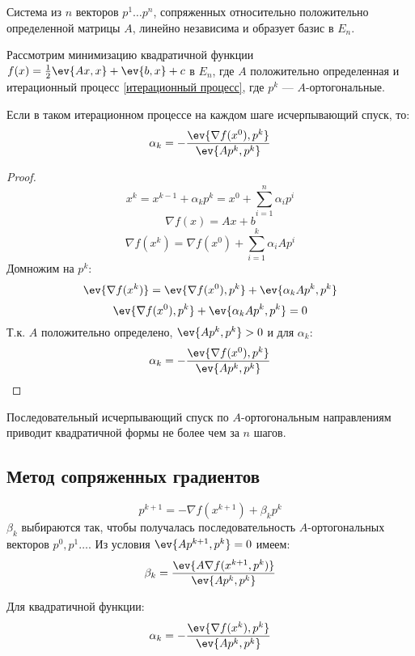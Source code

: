 Система из \(n\) векторов \(p^1 \dots p^n\), сопряженных относительно положительно определенной матрицы \(A\), линейно независима и образует базис в \(E_n\).

Рассмотрим минимизацию квадратичной функции \(f(x) = \frac{1}{2} \ev{Ax, x} + \ev{b, x} + c\) в \(E_n\), где \(A\) положительно определенная и итерационный процесс \eqref{итерационный процесс}, где \(p^k\) --- \(A\)-ортогональные.

Если в таком итерационном процессе на каждом шаге исчерпывающий спуск, то:
\[\alpha_k = -\frac{\ev{\nabla f(x^0), p^k}}{\ev{A p^k, p^k}} \]

\begin{proof}
    \[x^k = x^{k - 1} + \alpha_k p^k = x^0 + \sum_{i = 1}^n \alpha_i p^i\]
    \[\nabla f(x) = Ax + b\]
    \[\nabla f(x^k) = \nabla f(x^0) + \sum_{i = 1}^k \alpha_i A p^i\]
    Домножим на \(p^k\):
    \[\ev{\nabla f(x^k)} = \ev{\nabla f(x^0), p^k} + \ev{\alpha_k A p^k, p^k} \]
    \[\ev{\nabla f(x^0), p^k} + \ev{\alpha_k A p^k, p^k} = 0\]
    Т.к. \(A\) положительно определено, \(\ev{A p^k, p^k} > 0\) и для \(\alpha_k\):
    \[\alpha_k = -\frac{\ev{\nabla f(x^0), p^k}}{\ev{A p^k, p^k}} \]
\end{proof}

\begin{theorem}
    Последовательный исчерпывающий спуск по \(A\)-ортогональным направлениям приводит квадратичной формы не более чем за \(n\) шагов.
\end{theorem}

\subsection{Метод сопряженных градиентов}

\begin{equation}
    p^{k + 1} = - \nabla f (x^{k + 1}) + \beta_k p^k
    \label{процесс сопряженных}
\end{equation}
\(\beta_k\) выбираются так, чтобы получалась последовательность \(A\)-ортогональных векторов \(p^0, p^1 \dots \). Из условия \(\ev{A p^{k + 1}, p^k} = 0\) имеем:
\begin{equation}
    \beta_k = \frac{\ev{A \nabla f(x^{k + 1}, p^k)}}{\ev{A p^k, p^k}}
    \label{beta}
\end{equation}

Для квадратичной функции:
\begin{equation}
    \alpha_k = -\frac{\ev{\nabla f(x^k), p^k}}{\ev{A p^k, p^k}}
    \label{alpha}
\end{equation}


